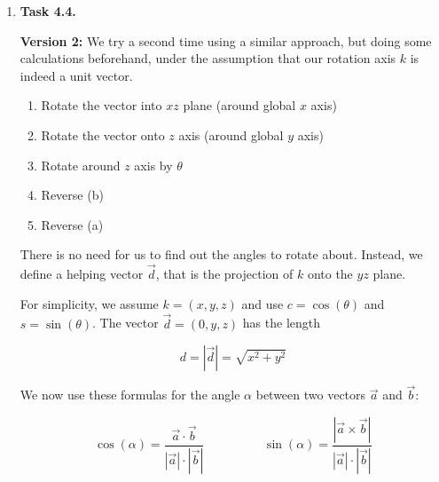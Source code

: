 \documentclass[a4paper,11pt]{article}
\begin{document}
\begin {enumerate}
	\item[\textbf{Task 4.4.}]

		\textbf{Version 2:} We try a second time using a similar approach, but doing some calculations beforehand, under the assumption that our rotation axis $k$ is indeed a unit vector.

		\begin{enumerate}
			\item Rotate the vector into $xz$ plane (around global $x$ axis)
			\item Rotate the vector onto $z$ axis (around global $y$ axis)
			\item Rotate around $z$ axis by $\theta$
			\item Reverse (b)
			\item Reverse (a)
		\end{enumerate}





		There is no need for us to find out the angles to rotate about. Instead, we define a helping vector $\vec{d}$, that is the projection of $k$ onto the $yz$ plane.

		For simplicity, we assume $k = (x, y, z)$ and use $c = \cos(\theta)$ and $s = \sin(\theta)$. The vector $\vec{d} = (0, y, z)$ has the length

		$$d = |\vec{d}| = \sqrt{x^2 + y^2}$$

		We now use these formulas for the angle $\alpha$ between two vectors $\vec{a}$ and $\vec{b}$:

		$$\cos(\alpha) = \frac{\vec{a} \cdot \vec{b}}{|\vec{a}| \cdot |\vec{b}|}
		\hspace{2cm}
		\sin(\alpha) = \frac{| \vec{a} \times \vec{b} |}{|\vec{a}| \cdot |\vec{b}|}$$


\end{enumerate}
\end{document}

